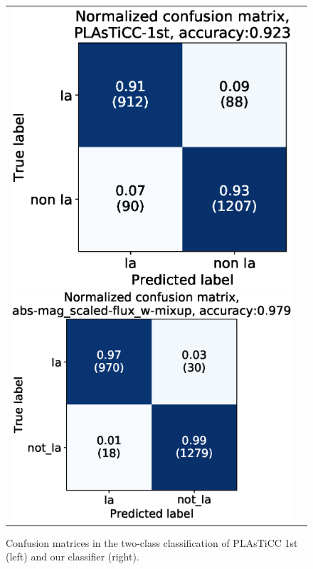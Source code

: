 \documentclass[useamsfonts]{pasj01}
\begin{document}
\begin{figure}[ht]
    \begin{tabular}{cc}
        \begin{minipage}{0.5\hsize}
            \begin{center}
                \includegraphics[width=\columnwidth]{figures/07_CM_PLAsTiCC-1st_submission_aug22_2class_2.eps}
            \end{center}
        \end{minipage}
        \begin{minipage}{0.5\hsize}
            \begin{center}
                \includegraphics[width=\columnwidth]{figures/03_CM_abs-mag_scaled-flux_w-mixup_predictions_test_2.eps}
            \end{center}
        \end{minipage}
    \end{tabular}  \caption{%
    Confusion matrices in the two-class classification of PLAsTiCC 1st (left) and our classifier (right).
    }%
    \label{fig:comp_plasticc_1st}
\end{figure}
%
%
\end{document}
